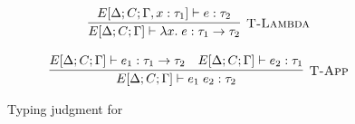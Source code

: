\begin{figure}
\[\begin{array}{c}
      \\\\
      \labinfer[T-Lambda]{E[\Delta;C;\Gamma] \vdash \lambda x.\; e : \tau_1 \ra \tau_2}
        {E[\Delta;C;\Gamma, x : \tau_1] \vdash e : \tau_2}
      \\\\
      \labinfer[T-App]{E[\Delta;C;\Gamma] \vdash e_1\; e_2 : \tau_2}
        {E[\Delta;C;\Gamma] \vdash e_1 : \tau_1 \ra \tau_2
        &E[\Delta;C;\Gamma] \vdash e_2 : \tau_1}
    \end{array}
  \]
  \caption{Typing judgment for \Pika}
  \label{fig:pika-typing-judgment}
\end{figure}

